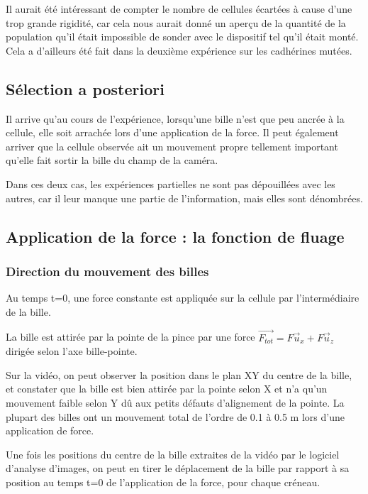 Il aurait été intéressant de compter le nombre de cellules écartées à cause d'une trop grande rigidité, car cela nous aurait donné un aperçu de la quantité de la population qu'il était impossible de sonder avec le dispositif tel qu'il était monté. Cela a d'ailleurs été fait dans la deuxième expérience sur les cadhérines mutées. 

\subsection{Sélection a posteriori}

Il arrive qu'au cours de l'expérience, lorsqu'une bille n'est que peu ancrée à la cellule, elle soit arrachée lors d'une application de la force.
Il peut également arriver que la cellule observée ait un mouvement propre tellement important qu'elle fait sortir la bille du  champ de la caméra. 

Dans ces deux cas, les expériences partielles ne sont pas dépouillées avec les autres, car il leur manque une partie de l'information, mais elles sont dénombrées.

\subsection{Application de la force : la fonction de fluage}

\subsubsection{Direction du mouvement des billes}
Au temps t=0, une force constante est appliquée sur la cellule par l'intermédiaire de la bille. 

La bille est attirée par la pointe de la pince par une force $\vec{F_{tot}}=F \vec{u}_x+F\vec{u}_z$ dirigée selon l'axe bille-pointe. 

Sur la vidéo, on peut observer la position dans le plan XY du centre de la bille, et constater que la bille est bien attirée par la pointe selon X et n'a qu'un mouvement faible selon Y dû aux petits défauts d'alignement de la pointe. La plupart des billes ont un mouvement total de l'ordre de 0.1 à 0.5 \micro m lors d'une application de force. 

Une fois les positions du centre de la bille extraites de la vidéo par le logiciel d'analyse d'images, on peut en tirer le déplacement de la bille par rapport à sa position au temps t=0 de l'application de la force, pour chaque créneau. 
 

